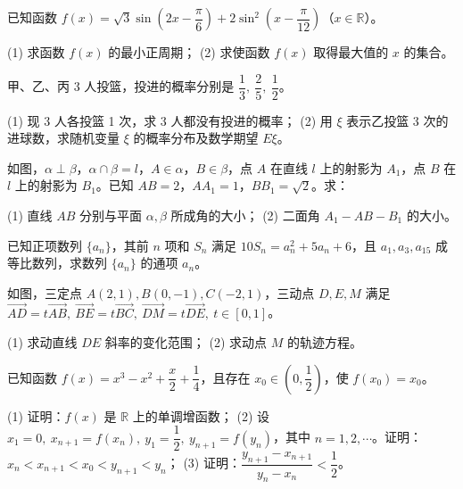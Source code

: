 \begin{question}
已知函数 \(f(x)=\sqrt3\sin\left(2x-\dfrac\pi6\right)+2\sin^2\left(x-\dfrac\pi{12}\right)\)（\(x\in\mathbb R\)）。

(1) 求函数 \(f(x)\) 的最小正周期；
(2) 求使函数 \(f(x)\) 取得最大值的 \(x\) 的集合。

\end{question}
\begin{question}
甲、乙、丙 3 人投篮，投进的概率分别是 \(\dfrac13,\ \dfrac25,\ \dfrac12\)。

(1) 现 3 人各投篮 1 次，求 3 人都没有投进的概率；
(2) 用 \(\xi\) 表示乙投篮 3 次的进球数，求随机变量 \(\xi\) 的概率分布及数学期望 \(E\xi\)。

\Needspace{0.4\textheight}
\end{question}
\begin{question}
如图，\(\alpha\perp\beta\)，\(\alpha\cap\beta=l\)，\(A\in\alpha\)，\(B\in\beta\)，点 \(A\) 在直线 \(l\) 上的射影为 \(A_1\)，点 \(B\) 在 \(l\) 上的射影为 \(B_1\)。已知 \(AB=2\)，\(AA_1=1\)，\(BB_1=\sqrt2\)。求：

(1) 直线 \(AB\) 分别与平面 \(\alpha,\beta\) 所成角的大小；
(2) 二面角 \(A_1-AB-B_1\) 的大小。
\nopagebreak[4]
\begin{center}\end{center}
\nopagebreak[4]
\end{question}
\begin{question}
已知正项数列 \(\{a_n\}\)，其前 \(n\) 项和 \(S_n\) 满足 \(10S_n=a_n^2+5a_n+6\)，且 \(a_1,a_3,a_{15}\) 成等比数列，求数列 \(\{a_n\}\) 的通项 \(a_n\)。

\Needspace{0.4\textheight}
\end{question}
\begin{question}
如图，三定点 \(A(2,1),B(0,-1),C(-2,1)\)，三动点 \(D,E,M\) 满足 \(\overrightarrow{AD}=t\overrightarrow{AB},\ \overrightarrow{BE}=t\overrightarrow{BC},\ \overrightarrow{DM}=t\overrightarrow{DE},\ t\in[0,1]\)。

(1) 求动直线 \(DE\) 斜率的变化范围；
(2) 求动点 \(M\) 的轨迹方程。
\nopagebreak[4]
\begin{center}\end{center}
\nopagebreak[4]
\end{question}
\begin{question}
已知函数 \(f(x)=x^3-x^2+\dfrac x2+\dfrac14\)，且存在 \(x_0\in\left(0,\dfrac12\right)\)，使 \(f(x_0)=x_0\)。

(1) 证明：\(f(x)\) 是 \(\mathbb R\) 上的单调增函数；
(2) 设 \(x_1=0,\ x_{n+1}=f(x_n),\ y_1=\dfrac12,\ y_{n+1}=f(y_n)\)，其中 \(n=1,2,\cdots\)。证明：\(x_n<x_{n+1}<x_0<y_{n+1}<y_n\)；
(3) 证明：\(\dfrac{y_{n+1}-x_{n+1}}{y_n-x_n}<\dfrac12\)。

\end{question}